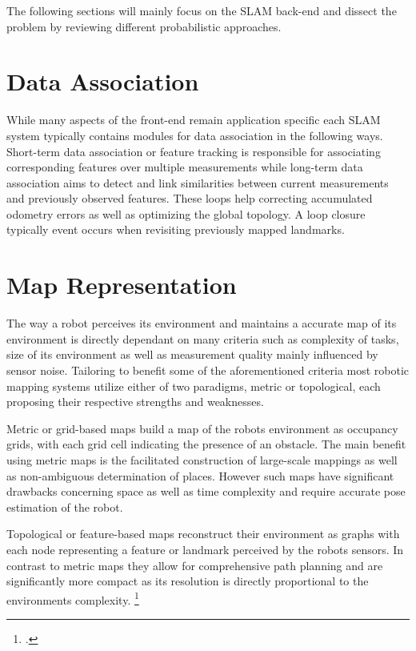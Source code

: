 The following sections will mainly focus on the SLAM back-end and dissect the problem by reviewing different probabilistic approaches. 




\section{Data Association}
While many aspects of the front-end remain application specific each SLAM system typically contains modules for data association in the following ways.
Short-term data association or feature tracking is responsible for associating corresponding features over multiple measurements while long-term data association aims to detect and link similarities between current measurements and previously observed features. These loops help correcting accumulated odometry errors as well as optimizing the global topology. 
A loop closure typically event occurs when revisiting previously mapped landmarks.

\section{Map Representation}
The way a robot perceives its environment and maintains a accurate map of its environment is directly dependant on many criteria such as complexity of tasks, size of its environment as well as measurement quality mainly influenced by sensor noise. 
Tailoring to benefit some of the aforementioned criteria most robotic mapping systems utilize either of two paradigms, metric or topological, each proposing their respective strengths and weaknesses.

Metric or grid-based maps build a map of the robots environment as occupancy grids, with each grid cell indicating the presence of an obstacle. The main benefit using metric maps is the facilitated construction of large-scale mappings as well as non-ambiguous determination of places. However such maps have significant drawbacks concerning space as well as time complexity and require accurate pose estimation of the robot.

Topological or feature-based maps reconstruct their environment as graphs with each node representing a feature or landmark perceived by the robots sensors. In contrast to metric maps they allow for comprehensive path planning and are significantly more compact as its resolution is directly proportional to the environments complexity. \footcite{thrunMaps1998}



